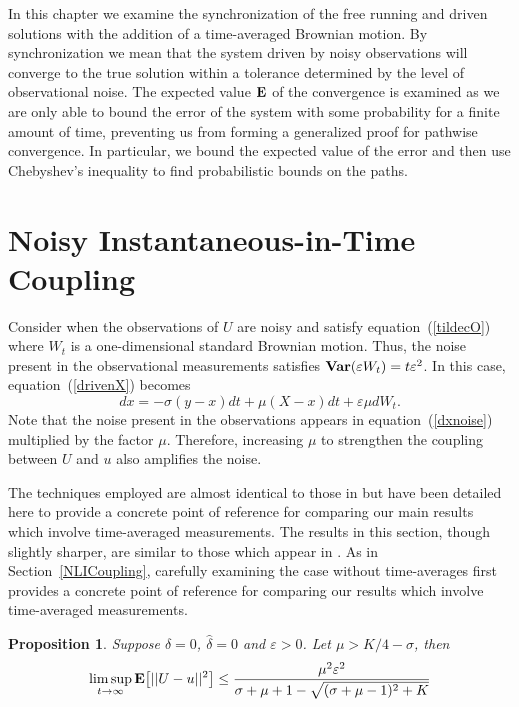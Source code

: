 \documentclass[master,tocprelim,12pt]{unrthesis}
\newtheorem{proposition}{Proposition}[chapter]
\theoremstyle{definition}
\numberwithin{equation}{chapter}
\begin{document}
\begin{manuscript}
In this chapter we examine the synchronization of the free running and driven
solutions with the addition of a time-averaged Brownian motion. By
synchronization we mean that the system driven by noisy observations will converge
to the true solution within a tolerance determined by the level of observational noise.
The expected value $\bf E$ of the convergence is examined as we are only able to
bound the error of the system with some probability for a finite
amount of time, preventing us from forming a generalized proof for pathwise convergence.
In particular, we bound the expected value of the error 
and then use Chebyshev's inequality to find probabilistic 
bounds on the paths.

\section{Noisy Instantaneous-in-Time Coupling}

Consider when the observations of $U$
are noisy and satisfy equation~(\ref{tildecO})
where $W_t$ is a one-dimensional 
standard Brownian motion.
Thus, the noise present in the observational measurements 
satisfies ${\bf Var}(\varepsilon W_t)= t\varepsilon^2$.
In this case, equation~(\ref{drivenX}) becomes
\begin{equation}\label{dxnoise}
    dx = -\sigma(y-x)dt+\mu(X-x)dt + \varepsilon \mu dW_t.
\end{equation}
Note that the noise present in the observations appears
in equation~(\ref{dxnoise}) multiplied by the factor $\mu$.
Therefore, increasing $\mu$ to strengthen the coupling 
between $U$ and $u$
also amplifies the noise.  

The techniques employed are almost identical to those in \cite{Olson14} 
but have been detailed here to provide a concrete point of reference
for comparing our main results which involve time-averaged measurements.
The results in this section, though slightly sharper,
are similar to those which appear in \cite{Stuart14}. 
As in Section~\ref{NLICoupling}, carefully examining the case 
without time-averages first provides a concrete point of reference 
for comparing our results which involve time-averaged measurements.
\begin{proposition}\label{NIprop} 
Suppose $\delta=0$, $\hat\delta=0$ and $\varepsilon>0$.
Let $\mu>K/4-\sigma$, then
$$\limsup_{t\to\infty}{\bf E}\big[||U-u||^2\big] 
	\le
{\mu^2\varepsilon^2\over 
		\sigma+\mu+1-\sqrt{(\sigma+\mu-1)^2+K}
}$$
\end{proposition}


\end{manuscript}
\end{document}
